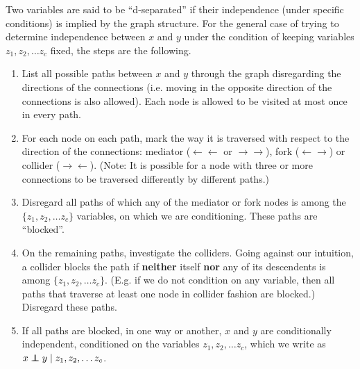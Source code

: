 
Two variables are said to be ``d-separated'' if their independence (under specific conditions) is implied by the graph structure. For the general case of trying to determine independence between $x$ and $y$ under the condition of keeping variables $z_1, z_2, \ldots z_c$ fixed, the steps are the following.
\begin{enumerate}
	\item List all possible paths between $x$ and $y$ through the graph disregarding the directions of the connections (i.e. moving in the opposite direction of the connections is also allowed). Each node is allowed to be visited at most once in every path.

	\item For each node on each path, mark the way it is traversed with respect to the direction of the connections: mediator ($\leftarrow\leftarrow$ or $\rightarrow\rightarrow$), fork ($\leftarrow\rightarrow$) or collider ($\rightarrow\leftarrow$). (Note: It is possible for a node with three or more connections to be traversed differently by different paths.)

	\item Disregard all paths of which any of the mediator or fork nodes is among the $\{z_1, z_2, \ldots z_c\}$ variables, on which we are conditioning. These paths are ``blocked''.

	\item On the remaining paths, investigate the colliders. Going against our intuition, a collider blocks the path if {\bf neither} itself {\bf nor} any of its descendents is among $\{z_1, z_2, \ldots z_c\}$. (E.g. if we do not condition on any variable, then all paths that traverse at least one node in collider fashion are blocked.) Disregard these paths.

	\item If all paths are blocked, in one way or another, $x$ and $y$ are conditionally independent, conditioned on the variables $z_1, z_2, \ldots z_c$, which we write as $x \independent y\;|\; z_1, z_2, \ldots z_c$.
\end{enumerate}

